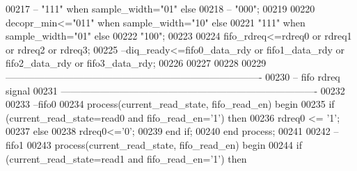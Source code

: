 \begin{DoxyCode}
00217 \textcolor{keyword}{--              "111" when sample\_width="01" else}
00218 \textcolor{keyword}{--              "000";}
00219   
00220   \textcolor{vhdlchar}{decopr_min}\textcolor{vhdlchar}{<=}\textcolor{vhdllogic}{"011"} \textcolor{keywordflow}{when} \textcolor{vhdlchar}{sample_width}\textcolor{vhdlchar}{=}\textcolor{vhdllogic}{"10"} \textcolor{keywordflow}{else} 
00221               \textcolor{vhdllogic}{"111"} \textcolor{keywordflow}{when} \textcolor{vhdlchar}{sample_width}\textcolor{vhdlchar}{=}\textcolor{vhdllogic}{"01"} \textcolor{keywordflow}{else}
00222               \textcolor{vhdllogic}{"100"};
00223 
00224 \textcolor{vhdlchar}{fifo_rdreq}\textcolor{vhdlchar}{<=}\textcolor{vhdlchar}{rdreq0} \textcolor{keywordflow}{or} \textcolor{vhdlchar}{rdreq1} \textcolor{keywordflow}{or} \textcolor{vhdlchar}{rdreq2} \textcolor{keywordflow}{or} \textcolor{vhdlchar}{rdreq3};
00225 \textcolor{keyword}{--diq\_ready<=fifo0\_data\_rdy or fifo1\_data\_rdy or fifo2\_data\_rdy or fifo3\_data\_rdy;}
00226 
00227 
00228 
00229 \textcolor{keyword}{-------------------------------------------------------------------------------         }
00230 \textcolor{keyword}{-- fifo rdreq signal}
00231 \textcolor{keyword}{-------------------------------------------------------------------------------}
00232 
00233 \textcolor{keyword}{--fifo0}
00234 \textcolor{keywordflow}{process}(current_read_state, fifo_read_en) \textcolor{keywordflow}{begin}
00235     \textcolor{keywordflow}{if} \textcolor{vhdlchar}{(}\textcolor{vhdlchar}{current_read_state}\textcolor{vhdlchar}{=}\textcolor{vhdlchar}{read0} \textcolor{keywordflow}{and} \textcolor{vhdlchar}{fifo_read_en}\textcolor{vhdlchar}{=}\textcolor{vhdlchar}{'}\textcolor{vhdllogic}{}\textcolor{vhdllogic}{1}\textcolor{vhdlchar}{'}\textcolor{vhdlchar}{)} \textcolor{keywordflow}{then}
00236             \textcolor{vhdlchar}{rdreq0} \textcolor{vhdlchar}{<=} \textcolor{vhdlchar}{'}\textcolor{vhdllogic}{}\textcolor{vhdllogic}{1}\textcolor{vhdlchar}{'}; 
00237     \textcolor{keywordflow}{else}
00238           \textcolor{vhdlchar}{rdreq0}\textcolor{vhdlchar}{<=}\textcolor{vhdlchar}{'}\textcolor{vhdllogic}{}\textcolor{vhdllogic}{0}\textcolor{vhdlchar}{'};
00239     \textcolor{keywordflow}{end} \textcolor{keywordflow}{if}; 
00240 \textcolor{keywordflow}{end} \textcolor{keywordflow}{process}; 
00241 
00242 \textcolor{keyword}{--fifo1}
00243 \textcolor{keywordflow}{process}(current_read_state, fifo_read_en) \textcolor{keywordflow}{begin}
00244     \textcolor{keywordflow}{if} \textcolor{vhdlchar}{(}\textcolor{vhdlchar}{current_read_state}\textcolor{vhdlchar}{=}\textcolor{vhdlchar}{read1} \textcolor{keywordflow}{and} \textcolor{vhdlchar}{fifo_read_en}\textcolor{vhdlchar}{=}\textcolor{vhdlchar}{'}\textcolor{vhdllogic}{}\textcolor{vhdllogic}{1}\textcolor{vhdlchar}{'}\textcolor{vhdlchar}{)} \textcolor{keywordflow}{then}

\end{DoxyCode}
